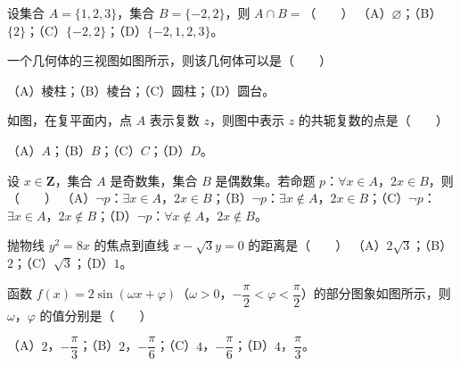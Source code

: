 \begin{question}
设集合 $A=\{1,2,3\}$，集合 $B=\{-2,2\}$，则 $A\cap B=$\mbox{（　　）}
（A）$\varnothing$；（B）$\{2\}$；（C）$\{-2,2\}$；（D）$\{-2,1,2,3\}$。
\Needspace{0.4\textheight}
\end{question}
\begin{question}
一个几何体的三视图如图所示，则该几何体可以是\mbox{（　　）}
\nopagebreak[4]
\begin{center}\end{center}
\nopagebreak[4]
（A）棱柱；（B）棱台；（C）圆柱；（D）圆台。
\Needspace{0.4\textheight}
\end{question}
\begin{question}
如图，在复平面内，点 $A$ 表示复数 $z$，则图中表示 $z$ 的共轭复数的点是\mbox{（　　）}
\nopagebreak[4]
\begin{center}\end{center}
\nopagebreak[4]
（A）$A$；（B）$B$；（C）$C$；（D）$D$。
\end{question}
\begin{question}
设 $x\in\mathbf Z$，集合 $A$ 是奇数集，集合 $B$ 是偶数集。若命题 $p$：$\forall x\in A$，$2x\in B$，则\mbox{（　　）}
（A）$\neg p$：$\exists x\in A$，$2x\in B$；（B）$\neg p$：$\exists x\notin A$，$2x\in B$；（C）$\neg p$：$\exists x\in A$，$2x\notin B$；（D）$\neg p$：$\forall x\notin A$，$2x\notin B$。
\end{question}
\begin{question}
抛物线 $y^2=8x$ 的焦点到直线 $x-\sqrt3y=0$ 的距离是\mbox{（　　）}
（A）$2\sqrt3$；（B）$2$；（C）$\sqrt3$；（D）$1$。
\Needspace{0.4\textheight}
\end{question}
\begin{question}
函数 $f(x)=2\sin(\omega x+\varphi)$（$\omega>0$，$-\dfrac\pi2<\varphi<\dfrac\pi2$）的部分图象如图所示，则 $\omega$，$\varphi$ 的值分别是\mbox{（　　）}
\nopagebreak[4]
\begin{center}\end{center}
\nopagebreak[4]
（A）$2$，$-\dfrac\pi3$；（B）$2$，$-\dfrac\pi6$；（C）$4$，$-\dfrac\pi6$；（D）$4$，$\dfrac\pi3$。
\Needspace{0.4\textheight}
\end{question}
